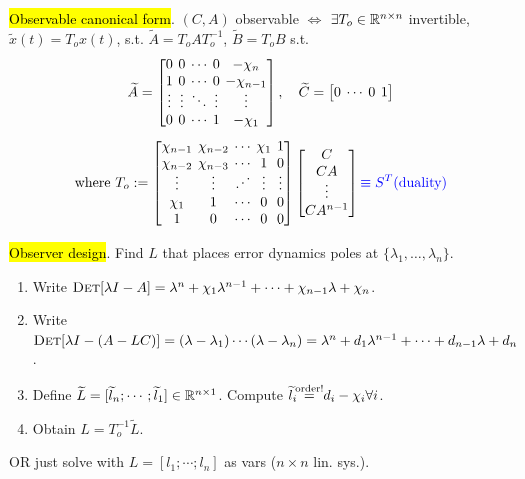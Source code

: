 \begin{Theorem}
\hl{Observable canonical form}. $(C,A)$ observable $\Leftrightarrow$ $\exists T_o\in\mathbb R^{n\times n}$ invertible, $\widetilde x(t)=T_ox(t)$, s.t. $\widetilde A=T_oAT_o^{-1}$, $\widetilde B=T_oB$ s.t.
\begin{equation*}
\widetilde A=\begin{bmatrix}
0 & 0 & \cdots & 0 & -\chi_n \\
1 & 0 & \cdots & 0 & -\chi_{n-1} \vspace{-1mm} \\
\vdots & \vdots & \ddots & \vdots & \vdots \\
0 & 0 & \cdots & 1 & -\chi_1
\end{bmatrix},\quad\widetilde C=\begin{bmatrix}
0 & \cdots & 0 & 1
\end{bmatrix}
\end{equation*}
\begin{equation*}
\def\arraycolsep{2pt}
\text{where }T_o:=\begin{bmatrix}
\chi_{n-1} & \chi_{n-2} & \cdots & \chi_1 & 1 \\
\chi_{n-2} & \chi_{n-3} & \cdots & 1 & 0 \vspace{-1mm} \\
\vdots & \vdots & \iddots & \vdots & \vdots \\
\chi_1 & 1 & \cdots & 0 & 0 \\
1 & 0 & \cdots & 0 & 0
\end{bmatrix}\begin{bmatrix}
C \\
CA \vspace{-1mm} \\
\vdots \\
CA^{n-1}
\end{bmatrix}\mc{blue}{\equiv S^T (\text{duality})}
\end{equation*}
\end{Theorem}
\begin{Method}
\hl{Observer design}. Find $L$ that places error dynamics poles at $\{\lambda_1,\ldots,\lambda_n\}$.
\begin{enumerate}[label=\protect\circled{\arabic*},leftmargin=4mm]
  \item Write $\textsc{Det}[\lambda I-A]=\lambda^n+\chi_1\lambda^{n-1}+\cdots+\chi_{n-1}\lambda+\chi_n$.
  \item Write $\textsc{Det}[\lambda I-(A-LC)]=(\lambda-\lambda_1)\cdots(\lambda-\lambda_n)=\lambda^n+d_1\lambda^{n-1}+\cdots+d_{n-1}\lambda+d_n$.
  \item Define $\widetilde L=[\widetilde l_n;\cdots;\widetilde l_1]\in\mathbb R^{n\times 1}$. Compute $\widetilde l_i\hspace{-1.5mm}\overset{\mathcal{\text{order!}}}{=}\hspace{-1mm}d_i-\chi_i\forall i$.
  \item Obtain $L=T_o^{-1}\widetilde L$. \QED
\end{enumerate}
OR just solve  with $L=[l_1;\cdots ; l_n]$ as vars ($n\times n$ lin. sys.).
\end{Method}
